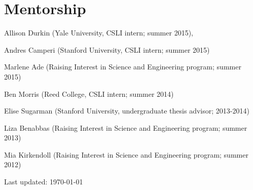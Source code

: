 \documentclass[letterpaper]{article}
\def\footerlink{}
\renewenvironment{itemize}{
  \begin{list}{}{
    \setlength{\leftmargin}{1.5em}
  }
}{
  \end{list}
}
\begin{document}
\section*{Mentorship}
\begin{itemize}
\item Allison Durkin (Yale University, CSLI intern; summer 2015), 
\item Andres Camperi (Stanford University, CSLI intern; summer 2015)
\item Marlene Ade (Raising Interest in Science and Engineering program; summer 2015)
\item Ben Morris (Reed College, CSLI intern; summer 2014)
\item Elise Sugarman (Stanford University, undergraduate thesis advisor; 2013-2014)
\item Liza Benabbas (Raising Interest in Science and Engineering program; summer 2013)
\item Mia Kirkendoll (Raising Interest in Science and Engineering program; summer 2012)

\end{itemize}


\bigskip

\begin{center}
  \begin{footnotesize}
    Last updated: \today \\
    \href{\footerlink}{\texttt{\footerlink}}
  \end{footnotesize}
\end{center}
\end{document}
